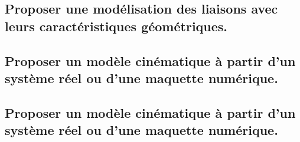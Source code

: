 \documentclass[10pt,fleqn]{book}
\newcommand{\repRel}{../..}
\newcommand{\repStyle}{\repRel/Style}
\newcommand{\td}{fichier_td}
\newcommand{\repExos}{\repRel/ExercicesCompetences}
\newcommand{\repExo}{dossier}
\begin{document}
\subsection{Proposer une modélisation des liaisons avec leurs caractéristiques géométriques.} 

\subsection{Proposer un modèle cinématique à partir d'un système réel ou d'une maquette numérique.} 

\subsection{Proposer un modèle cinématique à partir d'un système réel ou d'une maquette numérique.} 

\renewcommand{\repExo}{\repExos/B2_ProposerModele/B2_12_ModeliserSchemasCinematiques/01_T}
\renewcommand{\td}{01_T}
\graphicspath{{\repStyle/png/}{\repExo/images/}}


\renewcommand{\repExo}{\repExos/B2_ProposerModele/B2_12_ModeliserSchemasCinematiques/02_R}
\renewcommand{\td}{02_R}
\graphicspath{{\repStyle/png/}{\repExo/images/}}


\renewcommand{\repExo}{\repExos/B2_ProposerModele/B2_12_ModeliserSchemasCinematiques/03_TT}
\renewcommand{\td}{03_TT}
\graphicspath{{\repStyle/png/}{\repExo/images/}}


\renewcommand{\repExo}{\repExos/B2_ProposerModele/B2_12_ModeliserSchemasCinematiques/04_RR}
\renewcommand{\td}{04_RR}
\graphicspath{{\repStyle/png/}{\repExo/images/}}


\renewcommand{\repExo}{\repExos/B2_ProposerModele/B2_12_ModeliserSchemasCinematiques/05_RT}
\renewcommand{\td}{05_RT}
\graphicspath{{\repStyle/png/}{\repExo/images/}}


\renewcommand{\repExo}{\repExos/B2_ProposerModele/B2_12_ModeliserSchemasCinematiques/06_TR}
\renewcommand{\td}{06_TR}
\graphicspath{{\repStyle/png/}{\repExo/images/}}


\renewcommand{\repExo}{\repExos/B2_ProposerModele/B2_12_ModeliserSchemasCinematiques/07_RR3D}
\renewcommand{\td}{07_RR3D}
\graphicspath{{\repStyle/png/}{\repExo/images/}}


\renewcommand{\repExo}{\repExos/B2_ProposerModele/B2_12_ModeliserSchemasCinematiques/08_RR3D}
\renewcommand{\td}{08_RR3D}
\graphicspath{{\repStyle/png/}{\repExo/images/}}

\end{document}
